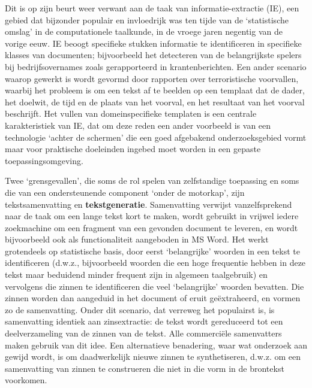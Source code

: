 \begin{multicols}{2}

    Dit is op zijn beurt weer verwant aan de taak van informatie-extractie (IE), een gebied dat bijzonder populair en invloedrijk was ten tijde van de `statistische omslag' in de computationele taalkunde, in de vroege jaren negentig van de vorige eeuw. IE beoogt specifieke stukken informatie te identificeren in specifieke klasses van documenten; bijvoorbeeld het detecteren van de belangrijkste spelers bij bedrijfsovernames zoals gerapporteerd in krantenberichten. Een ander scenario waarop gewerkt is wordt gevormd door rapporten over terroristische voorvallen, waarbij het probleem is om een tekst af te beelden op een templaat dat de dader, het doelwit, de tijd en de plaats van het voorval, en het resultaat van het voorval beschrijft. Het vullen van domeinspecifieke templaten is een centrale karakteristiek van IE, dat om deze reden een ander voorbeeld is van een technologie `achter de schermen' die een goed afgebakend onderzoeksgebied vormt maar voor praktische doeleinden ingebed moet worden in een gepaste toepassingsomgeving.

    Twee `grensgevallen', die soms de rol spelen van zelfstandige toepassing en soms die van een ondersteunende component `onder de motorkap', zijn tekstsamenvatting en \textbf{tekstgeneratie}. Samenvatting verwijst vanzelfsprekend naar de taak om een lange tekst kort te maken, wordt gebruikt in vrijwel iedere zoekmachine om een fragment van een gevonden document te leveren, en wordt bijvoorbeeld ook als functionaliteit aangeboden in MS Word. Het werkt grotendeels op statistische basis, door eerst `belangrijke' woorden in een tekst te identificeren (d.w.z., bijvoorbeeld woorden die een hoge frequentie hebben in deze tekst maar beduidend minder frequent zijn in algemeen taalgebruik) en vervolgens die zinnen te identificeren die veel `belangrijke' woorden bevatten. Die zinnen worden dan aangeduid in het document of eruit ge{\"e}xtraheerd, en vormen zo de samenvatting. Onder dit scenario, dat verreweg het populairst is, is samenvatting identiek aan zinsextractie: de tekst wordt gereduceerd tot een deelverzameling van de zinnen van de tekst. Alle commerci{\"e}le samenvatters maken gebruik van dit idee. Een alternatieve benadering, waar wat onderzoek aan gewijd wordt, is om daadwerkelijk nieuwe zinnen te synthetiseren, d.w.z. om een samenvatting van zinnen te construeren die niet in die vorm in de brontekst voorkomen.



\end{multicols}
